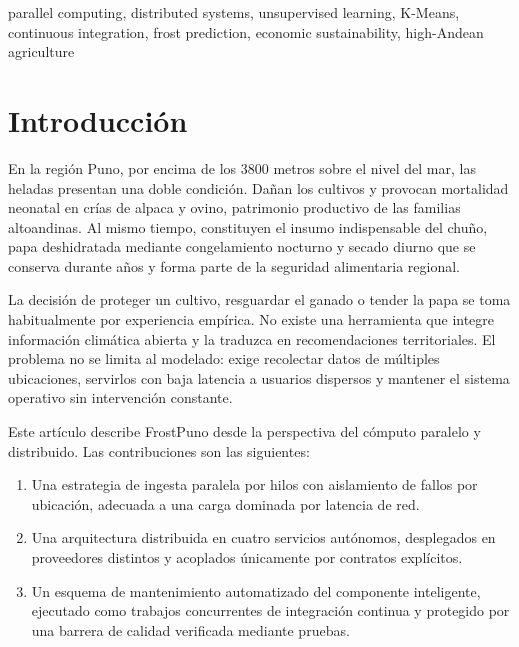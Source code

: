 \documentclass[conference]{IEEEtran}
\begin{document}
\begin{IEEEkeywords}
parallel computing, distributed systems, unsupervised learning, K-Means,
continuous integration, frost prediction, economic sustainability, high-Andean
agriculture
\end{IEEEkeywords}

\renewcommand{\abstractname}{Resumen}
\begin{abstract}
FrostPuno agrupa los reg\'imenes t\'ermicos de trece distritos de Puno mediante
aprendizaje no supervisado y entrega el resultado como servicio en producci\'on,
accesible desde la web, una interfaz de programaci\'on y una aplicaci\'on
Android. El sistema clasifica los trece distritos en tres niveles de riesgo con
un coeficiente de silueta de 0.419, opera con costo de infraestructura nulo y se
mantiene solo mediante reentrenamiento programado con una barrera de calidad
verificada por pruebas. Se propone adem\'as un modelo de sostenibilidad
econ\'omica basado en licenciamiento institucional que alcanza el punto de
equilibrio con pocos suscriptores.
\end{abstract}

\section{Introducci\'on}

En la regi\'on Puno, por encima de los 3800 metros sobre el nivel del mar, las
heladas presentan una doble condici\'on. Da\~nan los cultivos y provocan
mortalidad neonatal en cr\'ias de alpaca y ovino, patrimonio productivo de las
familias altoandinas. Al mismo tiempo, constituyen el insumo indispensable del
chu\~no, papa deshidratada mediante congelamiento nocturno y secado diurno que
se conserva durante a\~nos y forma parte de la seguridad alimentaria regional.

La decisi\'on de proteger un cultivo, resguardar el ganado o tender la papa se
toma habitualmente por experiencia emp\'irica. No existe una herramienta que
integre informaci\'on clim\'atica abierta y la traduzca en recomendaciones
territoriales. El problema no se limita al modelado: exige recolectar datos de
m\'ultiples ubicaciones, servirlos con baja latencia a usuarios dispersos y
mantener el sistema operativo sin intervenci\'on constante.

Este art\'iculo describe FrostPuno desde la perspectiva del c\'omputo paralelo y
distribuido. Las contribuciones son las siguientes:

\begin{enumerate}
\item Una estrategia de ingesta paralela por hilos con aislamiento de fallos por
ubicaci\'on, adecuada a una carga dominada por latencia de red.
\item Una arquitectura distribuida en cuatro servicios aut\'onomos, desplegados
en proveedores distintos y acoplados \'unicamente por contratos expl\'icitos.
\item Un esquema de mantenimiento automatizado del componente inteligente,
ejecutado como trabajos concurrentes de integraci\'on continua y protegido por
una barrera de calidad verificada mediante pruebas.
\end{enumerate}
\end{document}

